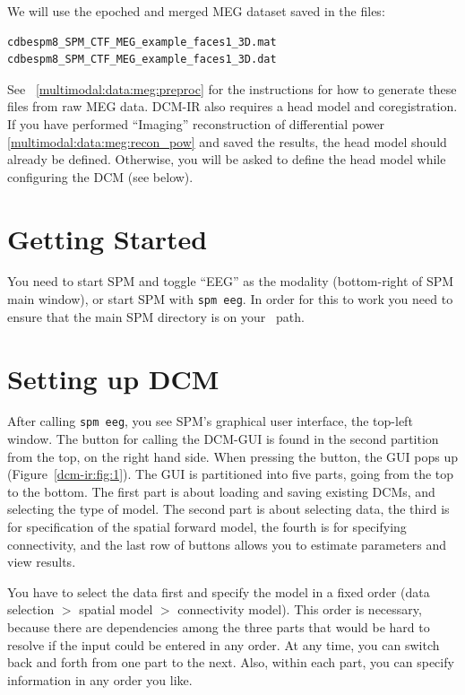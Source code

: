 We will use the epoched and merged MEG dataset saved in the files:

\begin{verbatim}
cdbespm8_SPM_CTF_MEG_example_faces1_3D.mat
cdbespm8_SPM_CTF_MEG_example_faces1_3D.dat
\end{verbatim}

See ~\ref{multimodal:data:meg:preproc} for the instructions for how to generate these files from raw MEG data. DCM-IR also requires a head model and coregistration. If you have performed ``Imaging'' reconstruction of differential power \ref{multimodal:data:meg:recon_pow} and saved the results, the head model should already be defined. Otherwise, you will be asked to define the head model while configuring the DCM (see below).

\section{Getting Started}

You need to start SPM and toggle ``EEG'' as the modality (bottom-right of SPM main window), or start SPM with \texttt{spm eeg}. In order for this to work you need to ensure that the main SPM directory is on your \matlab\ path.

\section{Setting up DCM}

After calling \texttt{spm eeg}, you see SPM's graphical user interface, the top-left window. The button for calling the DCM-GUI is found in the second partition from the top, on the right hand side. When pressing the button, the GUI pops up (Figure~\ref{dcm-ir:fig:1}). The GUI is partitioned into five parts, going from the top to the bottom. The first part is about loading and saving existing DCMs, and selecting the type of model. The second part is about selecting data, the third is for specification of the spatial forward model, the fourth is for specifying connectivity, and the last row of buttons allows you to estimate parameters and view results.


You have to select the data first and specify the model in a fixed order (data selection $>$ spatial model $>$
connectivity model). This order is necessary, because there are dependencies among the three parts that would be hard to resolve
if the input could be entered in any order. At any time, you can switch back and forth from one part to the next. Also, within each part, you can specify information in any order you like.

